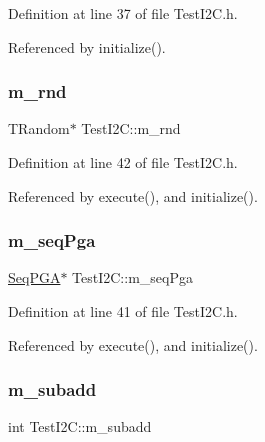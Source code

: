 Definition at line 37 of file Test\+I2\+C.\+h.



Referenced by initialize().

\mbox{\label{classTestI2C_a081620c62b9da7d6bdf335a3dd992e65}} 
\subsubsection{\texorpdfstring{m\+\_\+rnd}{m\_rnd}}
{\footnotesize\ttfamily T\+Random$\ast$ Test\+I2\+C\+::m\+\_\+rnd\hspace{0.3cm}{\ttfamily [private]}}



Definition at line 42 of file Test\+I2\+C.\+h.



Referenced by execute(), and initialize().

\mbox{\label{classTestI2C_a0dde635489298c8d914de5f925de0b62}} 
\subsubsection{\texorpdfstring{m\+\_\+seq\+Pga}{m\_seqPga}}
{\footnotesize\ttfamily \hyperlink{classSeqPGA}{Seq\+P\+GA}$\ast$ Test\+I2\+C\+::m\+\_\+seq\+Pga\hspace{0.3cm}{\ttfamily [private]}}



Definition at line 41 of file Test\+I2\+C.\+h.



Referenced by execute(), and initialize().

\mbox{\label{classTestI2C_aad3dc346b1a081e514e1d9681f89738f}} 
\subsubsection{\texorpdfstring{m\+\_\+subadd}{m\_subadd}}
{\footnotesize\ttfamily int Test\+I2\+C\+::m\+\_\+subadd\hspace{0.3cm}{\ttfamily [private]}}



